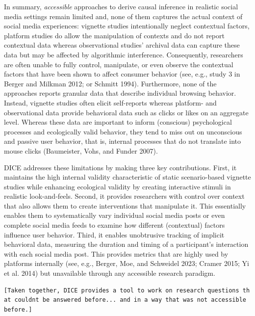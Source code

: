 \documentclass[
  a4paper,
]{scrreprt}
\begin{document}
In summary, \emph{accessible} approaches to derive causal inference in
realistic social media settings remain limited and, none of them
captures the actual context of social media experiences: vignette
studies intentionally neglect contextual factors, platform studies do
allow the manipulation of contexts and do not report contextual data
whereas observational studies' archival data can capture these data but
may be affected by algorithmic interference. Consequently, researchers
are often unable to fully control, manipulate, or even observe the
contextual factors that have been shown to affect consumer behavior
(see, e.g., study 3 in Berger and Milkman 2012; or Schmitt 1994).
Furthermore, none of the approaches reports granular data that describe
individual browsing behavior. Instead, vignette studies often elicit
self-reports whereas platform- and observational data provide behavioral
data such as clicks or likes on an aggregate level. Whereas these data
are important to inform (conscious) psychological processes and
ecologically valid behavior, they tend to miss out on unconscious and
passive user behavior, that is, internal processes that do not translate
into mouse clicks (Baumeister, Vohs, and Funder 2007).

DICE addresses these limitations by making three key contributions.
First, it maintains the high internal validity characteristic of static
scenario-based vignette studies while enhancing ecological validity by
creating interactive stimuli in realistic look-and-feels. Second, it
provides researchers with control over context that also allows them to
create interventions that manipulate it. This essentially enables them
to systematically vary individual social media posts or even complete
social media feeds to examine how different (contextual) factors
influence user behavior. Third, it enables unobtrusive tracking of
implicit behavioral data, measuring the duration and timing of a
participant's interaction with each social media post. This provides
metrics that are highly used by platforms internally (see, e.g., Berger,
Moe, and Schweidel 2023; Cramer 2015; Yi et al. 2014) but unavailable
through any accessible research paradigm.

\texttt{{[}Taken\ together,\ DICE\ provides\ a\ tool\ to\ work\ on\ research\ questions\ that\ couldn\textquotesingle{}t\ be\ answered\ before...\ and\ in\ a\ way\ that\ was\ not\ accessible\ before.{]}}
\end{document}
